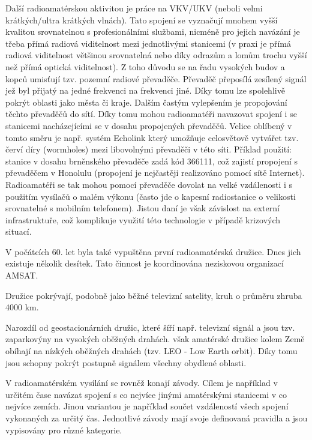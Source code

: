 Další radioamatérskou aktivitou je práce na VKV/UKV (neboli velmi krátkých/ultra
krátkých vlnách). Tato spojení se vyznačují mnohem vyšší kvalitou srovnatelnou s
profesionálními službami, nicméně pro jejich navázání je třeba přímá radiová
viditelnost mezi jednotlivými stanicemi (v praxi je přímá radiová viditelnost
většinou srovnatelná nebo díky odrazům a lomům trochu vyšší než přímá optická
viditelnost).
Z toho důvodu se na řadu vysokých budov a kopců umisťují tzv. pozemní radiové
převaděče. Převaděč přeposílá zesílený signál jež byl přijatý na jedné frekvenci
na frekvenci jiné. Díky tomu lze spolehlivě pokrýt oblasti jako města či kraje.
Dalším častým vylepšením je propojování těchto převaděčů do sítí. Díky tomu mohou
radioamatéři navazovat spojení i se stanicemi nacházejícími se v dosahu
propojených převaděčů. Velice oblíbený v tomto směru je např. systém
Echolink %
který umožňuje celosvětově vytvářet tzv. červí díry (wormholes) mezi libovolnými
převaděči v této síti. Příklad použití: stanice v dosahu brněnského převaděče
zadá kód 366111, což zajistí propojení s převaděčem v Honolulu (propojení je
nejčastěji realizováno pomocí sítě Internet). Radioamatéři se tak mohou pomocí převaděče dovolat na velké vzdálenosti i s použitím vysílačů o malém výkonu
(často jde o kapesní radiostanice o velikosti srovnatelné s mobilním telefonem).
Jistou daní je však závislost na externí infrastruktuře, což komplikuje využití
této technologie v případě krizových situací.

V počátcích 60. let byla také vypuštěna první radioamatérská družice. Dnes jich existuje několik desítek.
Tato činnost je koordinována neziskovou organizací AMSAT. %


Družice pokrývají, podobně jako běžné televizní satelity, kruh o průměru zhruba 4000 km. 

Narozdíl od geostacionárních družic, které šíří např. televizní
signál a jsou tzv. zaparkovýny na vysokých oběžných drahách. však amatérské
družice kolem Země obíhají na nízkých oběžných drahách (tzv. LEO - Low Earth
orbit). %
Díky tomu jsou schopny pokrýt postupně signálem všechny obydlené oblasti.

V radioamatérském vysílání se rovněž konají závody. Cílem je například v určitém čase navázat spojení s co nejvíce jinými
amatérskými stanicemi v co nejvíce zemích. Jinou variantou je například součet vzdáleností všech spojení vykonaných za určitý
čas. Jednotlivé závody mají svoje definovaná pravidla a jsou vypisovány pro
různé kategorie.

